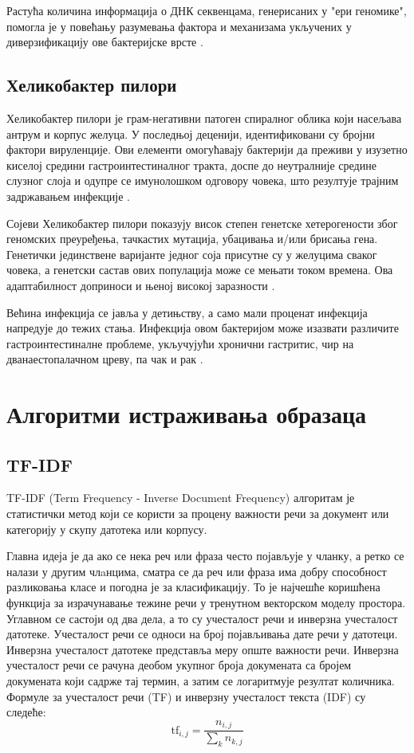 \documentclass[12pt]{article}
\begin{document}
Растућа количина информација о ДНК секвенцама, генерисаних у "ери геномике", помогла је у повећању разумевања фактора и механизама укључених у диверзификацију ове бактеријске врсте \cite{Desvaux2020-mx}. 

\subsection{Хеликобактер пилори}

Хеликобактер пилори је грам-негативни патоген спиралног облика који насељава антрум и корпус желуца. У последњој деценији, идентификовани су бројни фактори вируленције. Ови елементи омогућавају бактерији да преживи у изузетно киселој средини гастроинтестиналног тракта, доспе до неутралније средине слузног слоја и одупре се имунолошком одговору човека, што резултује трајним задржавањем инфекције \cite{2022helicobacter}.

Сојеви Хеликобактер пилори показују висок степен генетске хетерогености због геномских преуређења, тачкастих мутација, убацивања и/или брисања гена. Генетички јединствене варијанте једног соја присутне су у желуцима сваког човека, а генетски састав ових популација може се мењати током времена. Ова адаптабилност доприноси и њеној високој заразности \cite{Noto2012-rr}.

Већина инфекција се јавља у детињству, а само мали проценат инфекција напредује до тежих стања. Инфекција овом бактеријом може изазвати различите гастроинтестиналне проблеме, укључујући хронични гастритис, чир на дванаестопалачном цреву, па чак и рак \cite{2022helicobacter}.

\section{Алгоритми истраживања образаца}

\subsection{TF-IDF}

TF-IDF\cite{Liu2018-oa} (Term Frequency - Inverse Document Frequency) алгоритам
 је
статистички метод који се користи за процену важности речи
за документ или категорију у скупу датотека или корпусу. 

Главна идеја је да ако се нека реч или фраза често појављује у
чланку, а ретко се налази у другим члaнцима, сматра се
да реч или фраза има добру способност разликовања класе
и погодна је за класификацију. То је најчешће коришћена
функција за израчунавање тежине речи у тренутном
векторском моделу простора. Углавном се састоји од
два дела, а то су учесталост речи и инверзна учесталост
датотеке. Учесталост речи се односи на број појављивања
дате речи у датотеци. Инверзна учесталост датотеке представља
меру опште важности речи. Инверзна учесталост речи се рачуна деобом
укупног броја докумената са бројем
докумената који садрже тај термин, а затим се логаритмује
резултат количника. Формуле за учесталост речи (TF) и
инверзну учесталост текста (IDF) су следеће:
$$\mathrm{tf}_{i,j} = \frac{n_{i,j}}{\sum_{k} n_{k,j}}$$
\end{document}
